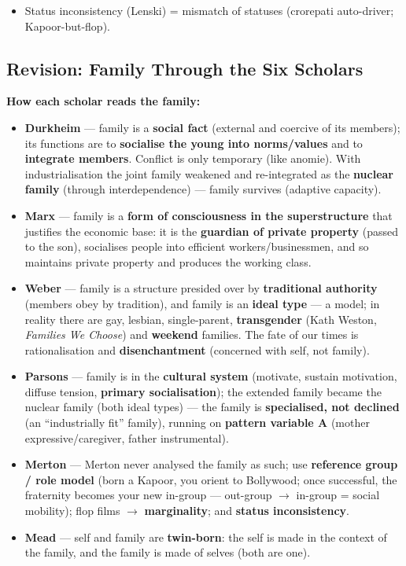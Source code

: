 \begin{QuickRevision}
\begin{itemize}
\item Status inconsistency (Lenski) = mismatch of statuses (crorepati auto-driver; Kapoor-but-flop).
\end{itemize}
\end{QuickRevision}

\sectiondivider

\subsection{Revision: Family Through the Six Scholars}

\begin{DataFact}
\textbf{How each scholar reads the family:}
\begin{itemize}
\item \textbf{Durkheim} --- family is a \textbf{social fact} (external and coercive of its members); its functions are to \textbf{socialise the young into norms/values} and to \textbf{integrate members}. Conflict is only temporary (like anomie). With industrialisation the joint family weakened and re-integrated as the \textbf{nuclear family} (through interdependence) --- family survives (adaptive capacity).
\item \textbf{Marx} --- family is a \textbf{form of consciousness in the superstructure} that justifies the economic base: it is the \textbf{guardian of private property} (passed to the son), socialises people into efficient workers/businessmen, and so maintains private property and produces the working class.
\item \textbf{Weber} --- family is a structure presided over by \textbf{traditional authority} (members obey by tradition), and family is an \textbf{ideal type} --- a model; in reality there are gay, lesbian, single-parent, \textbf{transgender} (Kath Weston, \textit{Families We Choose}) and \textbf{weekend} families. The fate of our times is rationalisation and \textbf{disenchantment} (concerned with self, not family).
\item \textbf{Parsons} --- family is in the \textbf{cultural system} (motivate, sustain motivation, diffuse tension, \textbf{primary socialisation}); the extended family became the nuclear family (both ideal types) --- the family is \textbf{specialised, not declined} (an ``industrially fit'' family), running on \textbf{pattern variable A} (mother expressive/caregiver, father instrumental).
\item \textbf{Merton} --- Merton never analysed the family as such; use \textbf{reference group / role model} (born a Kapoor, you orient to Bollywood; once successful, the fraternity becomes your new in-group --- out-group $\rightarrow$ in-group = social mobility); flop films $\rightarrow$ \textbf{marginality}; and \textbf{status inconsistency}.
\item \textbf{Mead} --- self and family are \textbf{twin-born}: the self is made in the context of the family, and the family is made of selves (both are one).
\end{itemize}
\end{DataFact}

